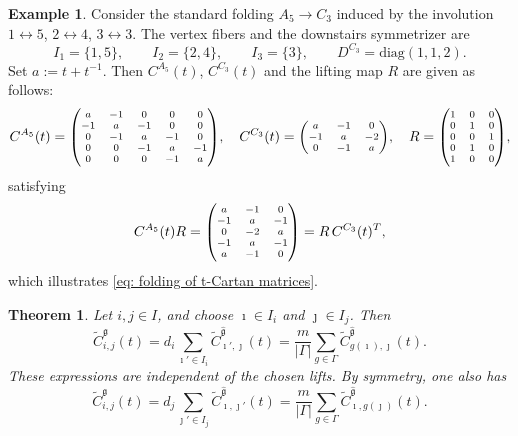 \documentclass[12pt, leqno]{amsart}
\numberwithin{equation}{section}
\theoremstyle{plain}
\newtheorem{theorem}[lemma]{Theorem}
\theoremstyle{definition}
\newtheorem{example}[lemma]{Example}
\newcommand{\seteq}{\mathbin{:=}}
\newcommand{\g}{\mathfrak{g}}
\newcommand{\im}{\imath}
\newcommand{\jm}{\jmath}
\newcommand{\tC}{\widetilde{C}}
\newcommand{\hg}{{\widehat{\g}}}
\newcommand{\diag}{\mathrm{diag}}
\begin{document}
\begin{example}\label{ex: A5 C3 t-Cartan folding}
Consider the standard folding
$A_5\longrightarrow C_3$
induced by the involution
$1\longleftrightarrow5$, $2\longleftrightarrow4$, $3\longleftrightarrow3$.
The vertex fibers and the downstairs symmetrizer are
\[
I_1=\{1,5\}, \qquad I_2=\{2,4\}, \qquad I_3=\{3\}, \qquad D^{C_3}=\diag(1,1,2).
\]
Set $a\seteq t+t^{-1}$. Then
$C^{A_5}(t)$, $C^{C_3}(t)$ and the lifting map $R$ are given as follows:
\[
C^{A_5}(t) =
{\scriptsize\begin{pmatrix}
a&-1&0&0&0\\
-1&a&-1&0&0\\
0&-1&a&-1&0\\
0&0&-1&a&-1\\
0&0&0&-1&a
\end{pmatrix}},
\quad
C^{C_3}(t)
=
{\scriptsize\begin{pmatrix}
a&-1&0\\
-1&a&-2\\
0&-1&a
\end{pmatrix}},
\quad 
R =
{\scriptsize\begin{pmatrix}
1&0&0\\
0&1&0\\
0&0&1\\
0&1&0\\
1&0&0
\end{pmatrix}},
\]
satisfying 
\[
C^{A_5}(t)R =
{\scriptsize\begin{pmatrix}
a&-1&0\\
-1&a&-1\\
0&-2&a\\
-1&a&-1\\
a&-1&0
\end{pmatrix}}
= R\,C^{C_3}(t)^T,
\]
which illustrates \eqref{eq: folding of t-Cartan matrices}.
\end{example}

\begin{theorem}\label{thm: folding of inverse t-Cartan matrices}
Let \(i,j\in I\), and choose $\im\in I_i$ and $\jm\in I_j$. 
Then
\begin{equation}\label{eq: folding inverse t-Cartan first fiber}
\tC_{i,j}^\g(t) = d_i \sum_{\im'\in I_i} \tC_{\im',\jm}^\hg(t)
= \frac{m}{|\Gamma|} \sum_{g\in \Gamma} \tC_{g(\im),\jm}^\hg(t).
\end{equation}
These expressions are independent of the chosen lifts.  By symmetry,
one also has
\begin{equation}\label{eq: folding inverse t-Cartan second fiber}
\tC_{i,j}^\g(t) = d_j \sum_{\jm'\in I_j} \tC_{\im,\jm'}^\hg(t)
= \frac{m}{|\Gamma|} \sum_{g\in \Gamma} \tC_{\im,g(\jm)}^\hg(t).
\end{equation}
\end{theorem}
\end{document}
